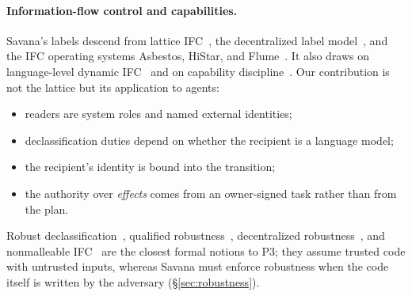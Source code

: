 \documentclass[letterpaper,twocolumn,10pt]{article}
\newcommand{\sys}{Savana}
\begin{document}
\paragraph{Information-flow control and capabilities.} \sys{}'s labels
descend from lattice IFC~\cite{denning1976}, the decentralized label
model~\cite{myers1997}, and the IFC operating systems Asbestos, HiStar, and
Flume~\cite{efstathopoulos2005,zeldovich2006,krohn2007}. It also draws on
language-level dynamic IFC~\cite{stefan2011lio} and on capability
discipline~\cite{dennis1966,miller2006robust}. Our contribution is not the
lattice but its application to agents:
\begin{itemize}
\item readers are system roles and named external identities;
\item declassification duties depend on whether the recipient is a
  language model;
\item the recipient's identity is bound into the transition;
\item the authority over \emph{effects} comes from an owner-signed task
  rather than from the plan.
\end{itemize}
Robust declassification~\cite{zdancewic2001robust}, qualified
robustness~\cite{myers2006qualified}, decentralized
robustness~\cite{chong2006decentralized}, and nonmalleable
IFC~\cite{cecchetti2017nmifc} are the closest formal notions to P3; they
assume trusted code with untrusted inputs, whereas \sys{} must enforce
robustness when the code itself is written by the adversary
(\S\ref{sec:robustness}).
\end{document}
